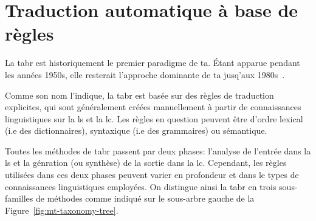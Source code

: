 \section{Traduction automatique à base de règles}
\label{sec:rbmt}

La \acrfull{tabr} est historiquement le premier paradigme de \acrshort{ta}. 
Étant apparue pendant les années 1950s, 
elle resterait l'approche dominante de \acrshort{ta} jusq'aux 1980s~\cite{routledge}.

Comme son nom l'indique, la \acrshort{tabr} est basée sur des règles de traduction explicites,
qui sont généralement créées manuellement à partir de connaissances linguistiques sur la \acrfull{ls} et la \acrfull{lc}. 
Les règles en question peuvent être d'ordre lexical (i.e des dictionnaires),
syntaxique (i.e des grammaires) ou sémantique.

Toutes les méthodes de \acrshort{tabr} passent par deux phases: 
l'analyse de l'entrée dans la \acrshort{ls} 
et la génration (ou synthèse) de la sortie dans la \acrshort{lc}. 
Cependant, les règles utilisées dans ces deux phases peuvent varier en profondeur
et dans le types de connaissances linguistiques employées. 
On distingue ainsi la \acrshort{tabr} en trois sous-familles de méthodes comme indiqué 
sur le sous-arbre gauche de la Figure~\ref{fig:mt-taxonomy-tree}.





